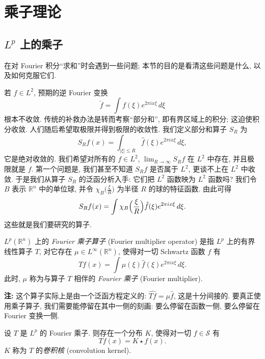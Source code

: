 \chapter{乘子理论}
\label{chap:1}

\section{\texorpdfstring{$L^p$}{Lp} 上的乘子}
\label{sec:1.1}

在对 Fourier 积分``求和''时会遇到一些问题; 本节的目的是看清这些问题是什么, 以及如何克服它们.

若 $f\in L^2$, 预期的逆 Fourier 变换
\[
\check{f}=\int f(\xi)e^{2\pi ix\xi}\,d\xi
\]
根本不收敛. 传统的补救办法是转而考察``部分和'', 即有界区域上的积分; 这迫使积分收敛. 人们随后希望取极限并得到极限的收敛性. 我们定义部分和算子 $S_R$ 为
\[
S_Rf(x)=\int_{|\xi|\leq R}\hat{f}(\xi)e^{2\pi ix\xi}\,d\xi,
\]
它是绝对收敛的. 我们希望对所有的 $f\in L^2$, $\lim_{R\to\infty}S_Rf$ 在 $L^2$ 中存在, 并且极限就是 $f$. 第一个问题是, 我们甚至不知道 $S_Rf$ 是否属于 $L^2$, 更谈不上在 $L^2$ 中收敛. 于是我们从算子 $S_R$ 的泛函分析入手: 它们把 $L^2$ 函数映为 $L^2$ 函数吗? 我们令 $B$ 表示 $\mathbb{R}^n$ 中的单位球, 并令 $\chi_B\bigl(\frac{\xi}{R}\bigr)$ 为半径 $R$ 的球的特征函数. 由此可得
\[
S_Rf(x)=\int\chi_B\Bigl(\frac{\xi}{R}\Bigr)\hat{f}(\xi)e^{2\pi ix\xi}\,d\xi.
\]
这些就是我们要研究的算子.

\begin{definition}\label{def:1.1}
$L^p(\mathbb{R}^n)$ 上的 \emph{Fourier 乘子算子} (Fourier multiplier operator) 是指 $L^p$ 上的有界线性算子 $T$, 对它存在 $\mu\in L^\infty(\mathbb{R}^n)$, 使得对一切 Schwartz 函数 $f$ 有
\[
Tf(x)=\int\mu(\xi)\hat{f}(\xi)e^{2\pi ix\xi}\,d\xi.
\]
此时, $\mu$ 称为与算子 $T$ 相伴的 \emph{Fourier 乘子} (Fourier multiplier).
\end{definition}

\noindent\textbf{注:} 这个算子实际上是由一个泛函方程定义的: $\widehat{Tf}=\mu\hat{f}$, 这是十分间接的. 要真正使用乘子算子, 我们需要能停留在其中一侧的刻画: 要么停留在函数一侧, 要么停留在 Fourier 变换一侧.

\begin{proposition}\label{prop:1.2}
设 $T$ 是 $L^p$ 的 Fourier 乘子. 则存在一个分布 $K$, 使得对一切 $f\in\mathcal{S}$ 有
\[
Tf(x)=K\star f(x).
\]
$K$ 称为 $T$ 的\emph{卷积核} (convolution kernel).
\end{proposition}

